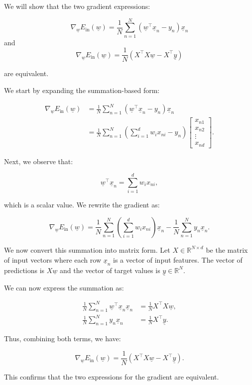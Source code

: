 \begin{example}
    We will show that the two gradient expressions:

    \[
    \nabla_{\underline{w}} E_{\text{in}}(\underline{w}) = \frac{1}{N} \sum_{n=1}^{N} \left( \underline{w}^\top \underline{x}_n - y_n \right) \underline{x}_n
    \]
    and
    \[
    \nabla_{\underline{w}} E_{\text{in}}(\underline{w}) = \frac{1}{N} \left( X^\top X \underline{w} - X^\top \underline{y} \right)
    \]

    are equivalent.

    We start by expanding the summation-based form:

    \begin{align*}
        \nabla_{\underline{w}} E_{\text{in}}(\underline{w}) &= \frac{1}{N} \sum_{n=1}^{N} \left( \underline{w}^\top \underline{x}_n - y_n \right) \underline{x}_n \\
        &= \frac{1}{N} \sum_{n=1}^{N} \left( \sum_{i=1}^{d} w_i x_{ni} - y_n \right) \begin{bmatrix} x_{n1} \\ x_{n2} \\ \vdots \\ x_{nd} \end{bmatrix}.
    \end{align*}

    Next, we observe that:

    \[
    \underline{w}^\top \underline{x}_n = \sum_{i=1}^{d} w_i x_{ni},
    \]

    which is a scalar value. We rewrite the gradient as:

    \[
    \nabla_{\underline{w}} E_{\text{in}}(\underline{w}) = \frac{1}{N} \sum_{n=1}^{N} \left( \sum_{i=1}^{d} w_i x_{ni} \right) \underline{x}_n - \frac{1}{N} \sum_{n=1}^{N} y_n \underline{x}_n.
    \]

    We now convert this summation into matrix form. Let \( X \in \mathbb{R}^{N \times d} \) be the matrix of input vectors where each row \( \underline{x}_n \) is a vector of input features. The vector of predictions is \( X \underline{w} \) and the vector of target values is \( \underline{y} \in \mathbb{R}^N \).

    We can now express the summation as:

    \begin{align*}
        \frac{1}{N} \sum_{n=1}^{N} \underline{w}^\top \underline{x}_n \underline{x}_n &= \frac{1}{N} X^\top X \underline{w}, \\
        \frac{1}{N} \sum_{n=1}^{N} y_n \underline{x}_n &= \frac{1}{N} X^\top \underline{y}.
    \end{align*}

    Thus, combining both terms, we have:

    \[
    \nabla_{\underline{w}} E_{\text{in}}(\underline{w}) = \frac{1}{N} \left( X^\top X \underline{w} - X^\top \underline{y} \right).
    \]

    This confirms that the two expressions for the gradient are equivalent.
\end{example}

